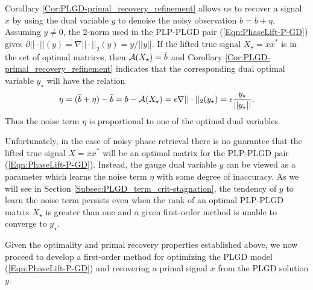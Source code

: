 Corollary \ref{Cor:PLGD-primal_recovery_refinement} allows us to recover a signal $x$ by using the dual variable $y$ to denoise the noisy observation $b = \bar{b} + \eta$.
Assuming $y \neq 0$, the $2$-norm used in the PLP-PLGD pair (\ref{Eqn:PhaseLift-P-GD}) gives $\partial ||\cdot||(y) = \nabla ||\cdot||_2(y) = y / ||y||$.  
If the lifted true signal $X_\star = \bar{x}\bar{x}^*$ is in the set of optimal matrices, then ${\mathcal A}(X_\star) = \bar{b}$ and Corollary \ref{Cor:PLGD-primal_recovery_refinement} indicates that the corresponding dual optimal variable $y_\star$ will have the relation 
\begin{equation} 			\label{Eqn:PLGD-noise_is_dual_variable}
\eta = (\bar{b} + \eta) - \bar{b} = b - {\mathcal A}(X_\star)  = \epsilon \nabla ||\cdot||_2(y_\star) = \epsilon \frac{y_\star}{||y_\star||}.
\end{equation}
Thus the noise term $\eta$ is proportional to one of the optimal dual variables.  


Unfortunately, in the case of noisy phase retrieval there is no guarantee that the lifted true signal $X = \bar{x}\bar{x}^*$ will be an optimal matrix for the PLP-PLGD pair (\ref{Eqn:PhaseLift-P-GD}).  
Instead, the gauge dual variable $y$ can be viewed as a parameter which learns the noise term $\eta$ with some degree of inaccuracy.  
As we will see in Section \ref{Subsec:PLGD_term_crit-stagnation}, the tendency of $y$ to learn the noise term persists even when the rank of an optimal PLP-PLGD matrix $X_\star$ is greater than one and a given first-order method is unable to converge to $y_\star$.


Given the optimality and primal recovery properties established above, we now proceed to develop a first-order method for optimizing the PLGD model (\ref{Eqn:PhaseLift-P-GD}) and recovering a primal signal $x$ from the PLGD solution $y$.



